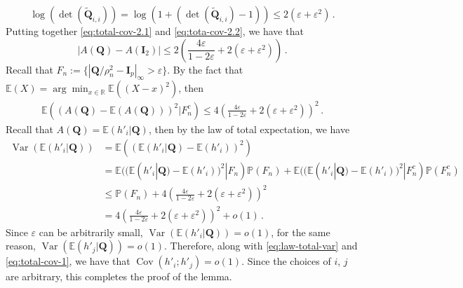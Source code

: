 \documentclass[11pt]{article}
\DeclareMathOperator{\Var}{Var}
\DeclareMathOperator{\Cov}{Cov}
\newcommand{\bI}{\boldsymbol{I}}
\newcommand{\bQ}{\boldsymbol{Q}}
\newcommand{\mbR}{\mathbb{R}}
\newcommand{\Expected}{\mathbb{E}}
\newcommand{\Prob}{\mathbb{P}}
\begin{document}
\begin{equation}\label{eq:tota-cov-2.2}
    \log(\det(\widetilde{\bQ}_{i,i})) = \log(1+(\det(\widetilde{\bQ}_{i,i})-1)) \le 2(\varepsilon+\varepsilon^2)\,. 
\end{equation}
Putting together \eqref{eq:total-cov-2.1} and \eqref{eq:tota-cov-2.2}, we have that 
\[
|A(\bQ)-A(\bI_2)| \le 2 \left(\frac{4\varepsilon}{1-2\varepsilon}+2(\varepsilon+\varepsilon^2)\right)\,.
\]
Recall that $F_n:=\{|\bQ/\rho_n^2-\bI_p|_\infty > \varepsilon\}$. By the fact that $\Expected(X) = \arg\min_{x\in \mbR} \Expected((X-x)^2)$, then
\begin{align*}
    \Expected((A(\bQ)-\Expected(A(\bQ)))^2|F_n^c)\le 4\left(\frac{4\varepsilon}{1-2\varepsilon}+2(\varepsilon+\varepsilon^2)\right)^2\,.
\end{align*}
Recall that $A(\bQ) = \Expected(h'_i|\bQ)$, then by the law of total expectation, we have
\begin{align*}
    \Var(\Expected(h'_i|\bQ)) &= \Expected((\Expected(h'_i|\bQ)-\Expected(h'_i))^2)\\
        &= \Expected((\Expected(h'_i|\bQ)-\Expected(h'_i))^2|F_n)\Prob(F_n)+\Expected((\Expected(h'_i|\bQ)-\Expected(h'_i))^2|F_n^c)\Prob(F_n^c)\\
        &\le \Prob(F_n)+4\left(\frac{4\varepsilon}{1-2\varepsilon}+2(\varepsilon+\varepsilon^2)\right)^2\\
        &= 4\left(\frac{4\varepsilon}{1-2\varepsilon}+2(\varepsilon+\varepsilon^2)\right)^2+o(1)\,.
\end{align*}
Since $\varepsilon$ can be arbitrarily small, $\Var(\Expected(h'_i|\bQ))=o(1)$, for the same reason, $\Var(\Expected(h'_j|\bQ))=o(1)$.
Therefore, along with \eqref{eq:law-total-var} and \eqref{eq:total-cov-1}, we have that $\Cov(h'_i;h'_j)=o(1)$. Since the choices of $i$, $j$ are arbitrary, this completes the proof of the lemma.
\end{document}
